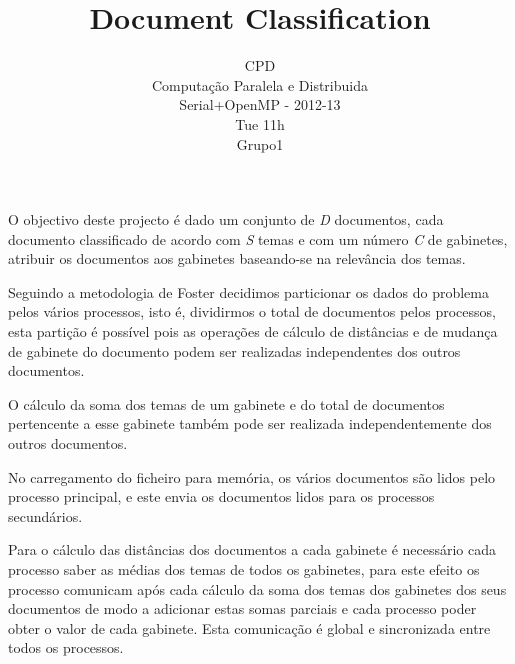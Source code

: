 \documentclass[times, 10pt,twocolumn]{article}
\begin{document}
\title{Document Classification}

\author{CPD\\
Computação Paralela e Distribuida\\
Serial+OpenMP - 2012-13\\
Tue 11h\\
 Grupo1
}
	   
\maketitle
\thispagestyle{empty}


O objectivo deste projecto é dado um conjunto de \emph{D} documentos, cada documento classificado de acordo com \emph{S} temas e com um número \emph{C} de gabinetes, atribuir os documentos aos gabinetes baseando-se na relevância dos temas.


Seguindo a metodologia de Foster decidimos  particionar os dados do problema pelos vários processos, isto é, dividirmos o total de documentos pelos processos, esta partição é possível pois as operações de cálculo de distâncias e de mudança de gabinete do documento podem ser realizadas independentes dos outros documentos.

O cálculo da soma dos temas de um gabinete e do total de documentos pertencente a esse gabinete também pode ser realizada independentemente dos outros documentos.

No carregamento do ficheiro para memória, os vários documentos são lidos pelo processo principal, e este envia os documentos lidos para os processos secundários.

Para o cálculo das distâncias dos documentos a cada gabinete é necessário cada processo saber as médias dos temas de todos os gabinetes, para este efeito os processo comunicam após cada cálculo da soma dos temas dos gabinetes dos seus documentos de modo a adicionar estas somas parciais e cada processo poder obter o valor de cada gabinete. Esta comunicação é global e sincronizada entre todos os processos.
\end{document}
